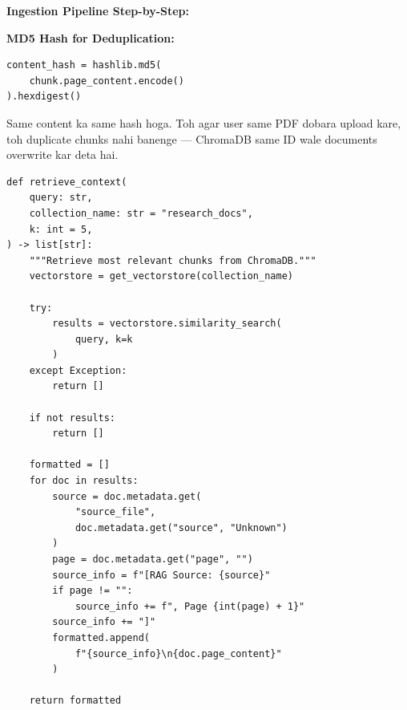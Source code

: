 \documentclass[12pt, a4paper]{article}
\begin{document}
\begin{codestorybox}
\textbf{Ingestion Pipeline Step-by-Step:}

\begin{center}
\end{center}

\textbf{MD5 Hash for Deduplication:}
\begin{lstlisting}[style=pythonstyle]
content_hash = hashlib.md5(
    chunk.page_content.encode()
).hexdigest()
\end{lstlisting}
Same content ka same hash hoga. Toh agar user same PDF dobara upload kare, toh duplicate chunks nahi banenge --- ChromaDB same ID wale documents overwrite kar deta hai.
\end{codestorybox}

\begin{lstlisting}[style=pythonstyle, title={\color{accentgreen}\faIcon{file} Semantic Retrieval}]
def retrieve_context(
    query: str,
    collection_name: str = "research_docs",
    k: int = 5,
) -> list[str]:
    """Retrieve most relevant chunks from ChromaDB."""
    vectorstore = get_vectorstore(collection_name)

    try:
        results = vectorstore.similarity_search(
            query, k=k
        )
    except Exception:
        return []

    if not results:
        return []

    formatted = []
    for doc in results:
        source = doc.metadata.get(
            "source_file",
            doc.metadata.get("source", "Unknown")
        )
        page = doc.metadata.get("page", "")
        source_info = f"[RAG Source: {source}"
        if page != "":
            source_info += f", Page {int(page) + 1}"
        source_info += "]"
        formatted.append(
            f"{source_info}\n{doc.page_content}"
        )

    return formatted
\end{lstlisting}
\end{document}
